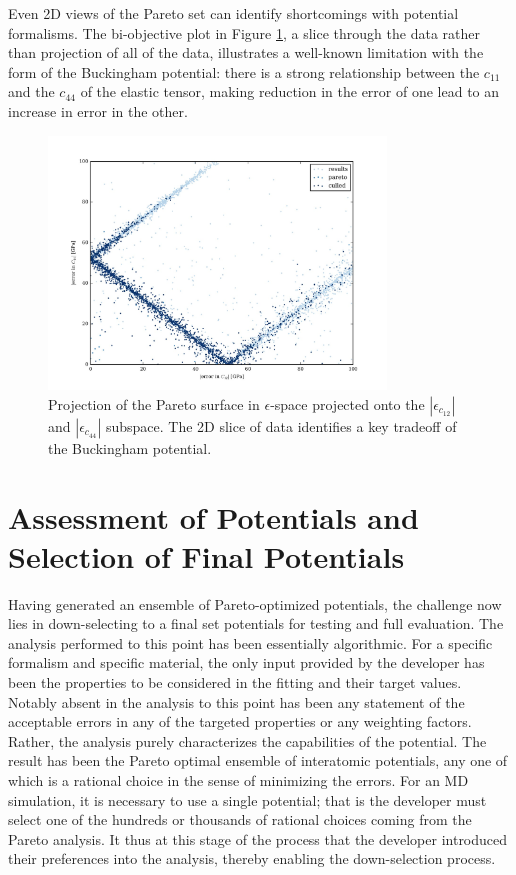Even 2D views of the Pareto set can identify shortcomings with potential formalisms.  The bi-objective plot in Figure \ref{fig:MgO_bivariate_c11_v_c44}, a slice through the data rather than projection of all of the data, illustrates a well-known limitation with the form of the Buckingham potential: there is a strong relationship between the $c_{11}$ and the $c_{44}$ of the elastic tensor, making reduction in the error of one lead to an increase in error in the other.

\begin{figure}[ht]
	\centering
  \includegraphics[width=0.8\textwidth]{chapter7/MgO_bivariate_c11_v_c44}
  \caption{Projection of the Pareto surface  in $\epsilon$-space projected onto the $|\epsilon_{c_{12}}|$ and $|\epsilon_{c_{44}}|$ subspace.  The 2D slice of data identifies a key tradeoff of the Buckingham potential.}
  \label{fig:MgO_bivariate_c11_v_c44}
\end{figure}


\section{Assessment of Potentials and Selection of Final Potentials}

Having generated an ensemble of Pareto-optimized potentials, the challenge now lies in down-selecting to a final set potentials for testing and full evaluation. The analysis performed to this point has been essentially algorithmic. For a specific formalism and specific material, the only input provided by the developer has been the properties to be considered in the fitting and their target values. Notably absent in the analysis to this point has been any statement of the acceptable errors in any of the targeted properties or any weighting factors. Rather, the analysis purely characterizes the capabilities of the potential. The result has been the Pareto optimal ensemble of interatomic potentials, any one of which is a rational choice in the sense of minimizing the errors. For an MD simulation, it is necessary to use a single potential; that is the developer must select one of the hundreds or thousands of rational choices coming from the Pareto analysis.  It thus at this stage of the process that the developer introduced their preferences into the analysis, thereby enabling the down-selection process.

